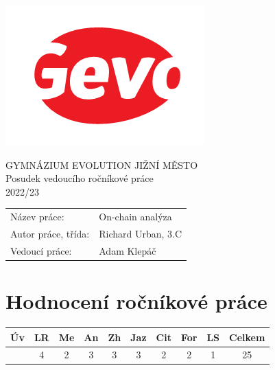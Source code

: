 \documentclass[a4paper,10pt]{article}
\begin{document}
\thispagestyle{fancy}
\begin{minipage}{.3\textwidth}
 \includegraphics[width=\textwidth]{logo}
\end{minipage}
\hfill
\begin{minipage}{.69\textwidth}
 \centering
 \Large{\sffamily
  GYMNÁZIUM EVOLUTION JIŽNÍ MĚSTO\\
  Posudek vedoucího ročníkové práce\\
  2022/23
 }
\end{minipage}

\begin{center}
 \large{
 \begin{tabular}{ll}
  \textsf{Název práce:} &
  \textsf{
   On-chain analýza
  }\\
  \textsf{Autor práce, třída:} &
  \textsf{
   Richard Urban, 3.C
  }\\
  \textsf{Vedoucí práce:} &
  \textsf{
   Adam Klepáč
  }
 \end{tabular}
 }
\end{center}

\section*{\sffamily \centering Hodnocení ročníkové práce}

\begin{center}
 \begin{tabular}{c|c|c|c|c|c|c|c|c|c}
  \sffamily
  Úv & LR & Me & An & Zh & Jaz & Cit & For & LS & Celkem\\
  \toprule
  \normalfont
  5
  &
  4
  &
  2
  &
  3
  &
  3
  &
  3
  &
  2
  &
  2
  &
  1
  &
  25
\end{tabular}
\end{center}
\end{document}
